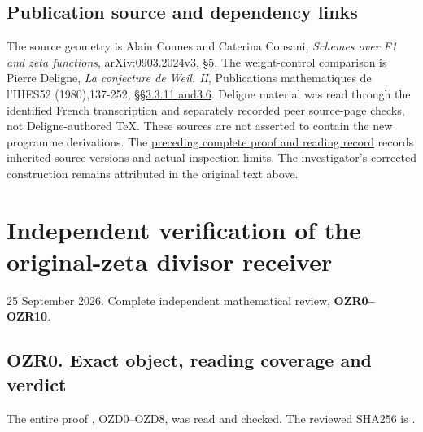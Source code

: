 \section{Publication source and dependency
links}\label{publication-source-and-dependency-links-5}

The source geometry is Alain Connes and Caterina Consani, \emph{Schemes
over F1 and zeta functions},
\href{https://arxiv.org/abs/0903.2024v3}{arXiv:0903.2024v3, §5}. The
weight-control comparison is Pierre Deligne, \emph{La conjecture de
Weil. II}, Publications mathematiques de l'IHES52 (1980),137-252,
\href{https://www.numdam.org/item/PMIHES_1980__52__137_0/}{§§3.3.11
and3.6}. Deligne material was read through the identified French
transcription and separately recorded peer source-page checks, not
Deligne-authored TeX. These sources are not asserted to contain the new
programme derivations. The
\href{https://github.com/KokunoYumeto/zeta-function-research-reader/blob/36a82ecca98addb8a98b48204e349737856c7223/workbenches/splitzero-tandem/continuations/20260924-cohomology-weight-and-character-lifts/BUILD_AND_REVIEW.md}{preceding
complete proof and reading record} records inherited source versions and
actual inspection limits. The investigator's corrected construction
remains attributed in the original text above.

\chapter{Independent verification of the original-zeta divisor
receiver}\label{independent-verification-of-the-original-zeta-divisor-receiver}

25 September 2026. Complete independent mathematical review,
\textbf{OZR0--OZR10}.

\section{OZR0. Exact object, reading coverage and
verdict}\label{ozr0.-exact-object-reading-coverage-and-verdict}

The entire proof
\href{https://github.com/KokunoYumeto/zeta-function-research-reader/blob/main/workbenches/splitzero-tandem/continuations/20260925-full-source-tensor-and-original-divisor/identity/ORIGINAL_ZETA_DIVISOR_DEFECT_RECEIVER.md}{},
OZD0--OZD8, was read and checked. The reviewed SHA256 is
.

